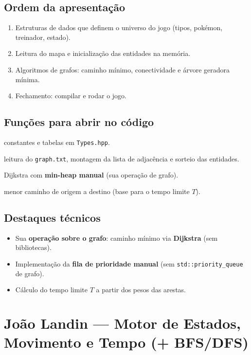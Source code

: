 \documentclass[11pt,a4paper]{article}
\begin{document}
\subsection{Ordem da apresentação}
\begin{enumerate}[leftmargin=2em,itemsep=2pt]
  \item Estruturas de dados que definem o universo do jogo (tipos, pokémon, treinador, estado).
  \item Leitura do mapa e inicialização das entidades na memória.
  \item Algoritmos de grafos: caminho mínimo, conectividade e árvore geradora mínima.
  \item Fechamento: compilar e rodar o jogo.
\end{enumerate}

\subsection{Funções para abrir no código}
\begin{description}[leftmargin=6em,style=nextline]
  \item[\texttt{catalogo\_especies} / \texttt{multiplicador\_tipo}] constantes e tabelas em \texttt{Types.hpp}.
  \item[\texttt{carregarMapa}] leitura do \texttt{graph.txt}, montagem da lista de adjacência e sorteio das entidades.
  \item[\texttt{dijkstra}] Dijkstra com \textbf{min-heap manual} (sua operação de grafo).
  \item[\texttt{dijkstraCaminho}] menor caminho de origem a destino (base para o tempo limite $T$).
\end{description}

\subsection{Destaques técnicos}
\begin{itemize}[leftmargin=2em,itemsep=2pt]
  \item Sua \textbf{operação sobre o grafo}: caminho mínimo via \textbf{Dijkstra} (sem bibliotecas).
  \item Implementação da \textbf{fila de prioridade manual} (sem \texttt{std::priority\_queue} de grafo).
  \item Cálculo do tempo limite $T$ a partir dos pesos das arestas.
\end{itemize}

\section{João Landin --- Motor de Estados, Movimento e Tempo (+ BFS/DFS)}
\end{document}
